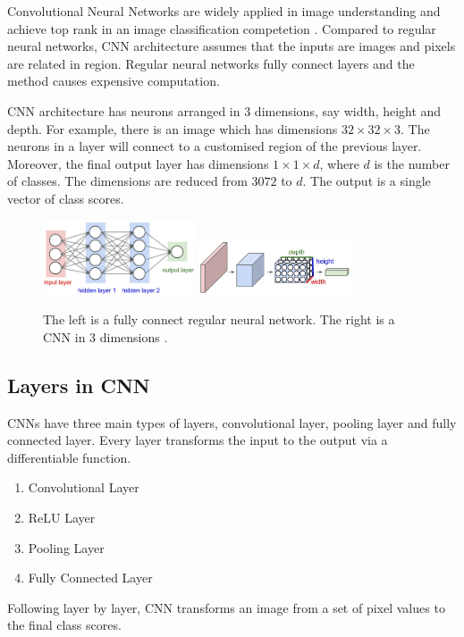 Convolutional Neural Networks \citep{lecun1998gradient} are widely applied in image understanding and achieve top rank in an image classification competetion \citep{krizhevsky2012imagenet}. Compared to regular neural networks, CNN architecture assumes that the inputs are images and pixels are related in region. Regular neural networks fully connect layers and the method causes expensive computation.

CNN architecture has neurons arranged in 3 dimensions, say width, height and depth. For example, there is an image which has dimensions $32\times 32\times 3$. The neurons in a layer will connect to a customised region of the previous layer. Moreover, the final output layer has dimensions $1\times 1\times d$, where $d$ is the number of classes. The dimensions are reduced from $3072$ to $d$. The output is a single vector of class scores.

\graphicspath{ {./Figures/} }
\begin{figure}[!htb]
\centering
\includegraphics[width=0.4\textwidth]{neural_net2.jpeg}
\includegraphics[width=0.4\textwidth]{cnn.jpeg}
\caption{\label{fig:compareCNNandFC}The left is a fully connect regular neural network. The right is a CNN in 3 dimensions \citep{CNNDiagram}.}
\end{figure}

\subsection{Layers in CNN}
CNNs have three main types of layers, convolutional layer, pooling layer and fully connected layer. Every layer transforms the input to the output via a differentiable function. 
\begin{enumerate}
  \item Convolutional Layer
  \item ReLU Layer
  \item Pooling Layer
  \item Fully Connected Layer
\end{enumerate}
Following layer by layer, CNN transforms an image from a set of pixel values to the final class scores.

